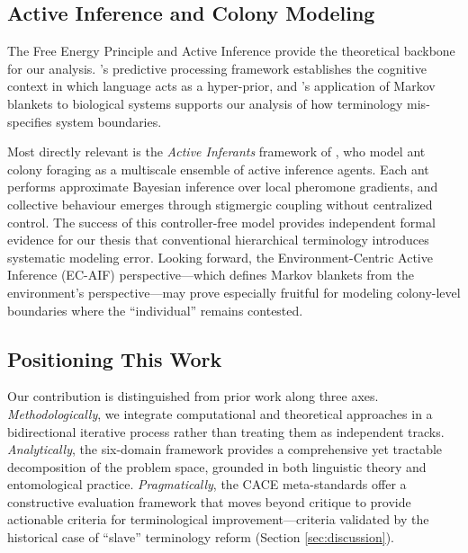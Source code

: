 \documentclass[
]{article}
\numberwithin{equation}{section}
\begin{document}
\subsection{Active Inference and Colony
Modeling}\label{active-inference-and-colony-modeling}

The Free Energy Principle and Active Inference
\cite{friston2010free, friston2013life} provide the theoretical backbone
for our analysis. \citeauthor{clark2013whatever}'s
\citeyearpar{clark2013whatever} predictive processing framework
establishes the cognitive context in which language acts as a
hyper-prior, and \citeauthor{kirchhoff2018markov}'s
\citeyearpar{kirchhoff2018markov} application of Markov blankets to
biological systems supports our analysis of how terminology
mis-specifies system boundaries.

Most directly relevant is the \emph{Active Inferants} framework of
\citet{friedman2021active}, who model ant colony foraging as a
multiscale ensemble of active inference agents. Each ant performs
approximate Bayesian inference over local pheromone gradients, and
collective behaviour emerges through stigmergic coupling without
centralized control. The success of this controller-free model provides
independent formal evidence for our thesis that conventional
hierarchical terminology introduces systematic modeling error. Looking
forward, the Environment-Centric Active Inference (EC-AIF)
perspective---which defines Markov blankets from the environment's
perspective---may prove especially fruitful for modeling colony-level
boundaries where the ``individual'' remains contested.

\subsection{Positioning This Work}\label{positioning-this-work}

Our contribution is distinguished from prior work along three axes.
\emph{Methodologically}, we integrate computational and theoretical
approaches in a bidirectional iterative process rather than treating
them as independent tracks. \emph{Analytically}, the six-domain
framework provides a comprehensive yet tractable decomposition of the
problem space, grounded in both linguistic theory and entomological
practice. \emph{Pragmatically}, the CACE meta-standards offer a
constructive evaluation framework that moves beyond critique to provide
actionable criteria for terminological improvement---criteria validated
by the historical case of ``slave'' terminology reform (Section
\ref{sec:discussion}).
\end{document}
